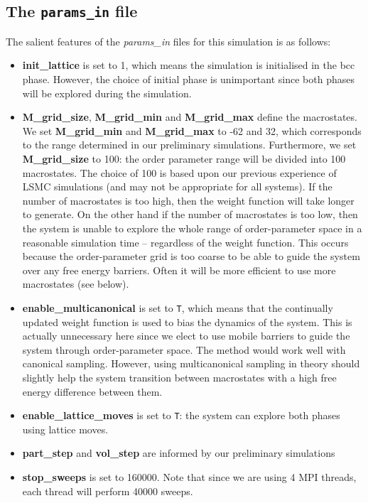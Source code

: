 \documentclass{report}
\begin{document}
\subsection{The \texttt{params\_in} file}
The salient features of the \emph{params\_in} files for this simulation is as follows:
\begin{itemize}
\item \textbf{init\_lattice} is set to 1, which means the simulation is initialised in the bcc phase. However, the choice of initial phase is 
  unimportant since both phases will be explored during the simulation.
\item \textbf{M\_grid\_size}, \textbf{M\_grid\_min} and \textbf{M\_grid\_max} define the macrostates. We set \textbf{M\_grid\_min} and \textbf{M\_grid\_max}
  to -62 and 32, which corresponds to the
  range determined in our preliminary simulations. Furthermore, we set \textbf{M\_grid\_size} to 100: the order parameter range will be divided into
  100 macrostates. The choice of 100 is based upon our previous experience of LSMC simulations (and may not be appropriate for all systems). 
  If the number of macrostates is too high, then the weight function will take longer to generate. On the other hand if the number of macrostates
  is too low, then the system is unable to explore the whole range of order-parameter space in a reasonable simulation time -- regardless
  of the weight function. This occurs because the order-parameter grid is too coarse to be able to guide the system over any free energy barriers.
  Often it will be more efficient to use more macrostates (see below).
\item \textbf{enable\_multicanonical} is set to \texttt{T}, which means that the continually updated weight function is used to bias the dynamics of the system.
  This is actually unnecessary here since we elect to use mobile barriers to guide the system through order-parameter space. The method would
  work well with canonical sampling. However, using multicanonical sampling in theory should slightly help the system transition between 
  macrostates with a high free energy difference between them.
\item \textbf{enable\_lattice\_moves} is set to \texttt{T}: the system can explore both phases using lattice moves.
\item \textbf{part\_step} and \textbf{vol\_step} are informed by our preliminary simulations
\item \textbf{stop\_sweeps} is set to 160000. Note that since we are using 4 MPI threads, each thread will perform 40000 sweeps.

\end{itemize}
\end{document}
